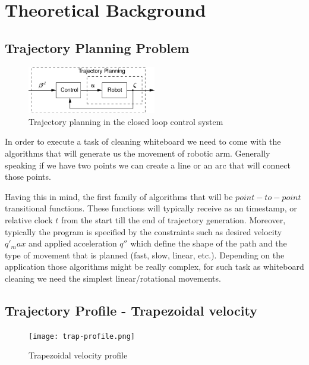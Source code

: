 \chapter{Theoretical Background}\label{chapter:basis}


\section{Trajectory Planning Problem}

\begin{figure}[htpb]
      \centering
      \includegraphics[width=0.5\textwidth]{figures/trajectory_planning.png}
      \caption{Trajectory planning in the closed loop control system}
      \label{fig:trajectory-loop}
\end{figure}

In order to execute a task of cleaning whiteboard we need to come with the algorithms that will generate us the movement of robotic arm. Generally speaking if we have two points we can create a line or an arc that will connect those points. 

Having this in mind, the first family of algorithms that will be $point-to-point$ transitional functions. These functions will typically receive as an timestamp, or relative clock $t$ from the start till the end of trajectory generation. Moreover, typically the program is specified by the constraints such as desired velocity $q'_max$ and applied acceleration $q''$ which define the shape of the path and the type of movement that is planned (fast, slow, linear, etc.). Depending on the application those algorithms might be really complex, for such task as whiteboard cleaning we need the simplest linear/rotational movements. 

\section{Trajectory Profile - Trapezoidal velocity}

\begin{figure}[htpb]
    \centering
    \texttt{[image: trap-profile.png]}
    \caption{Trapezoidal velocity profile}
    \label{fig:trapezoidal-profile}
\end{figure}

